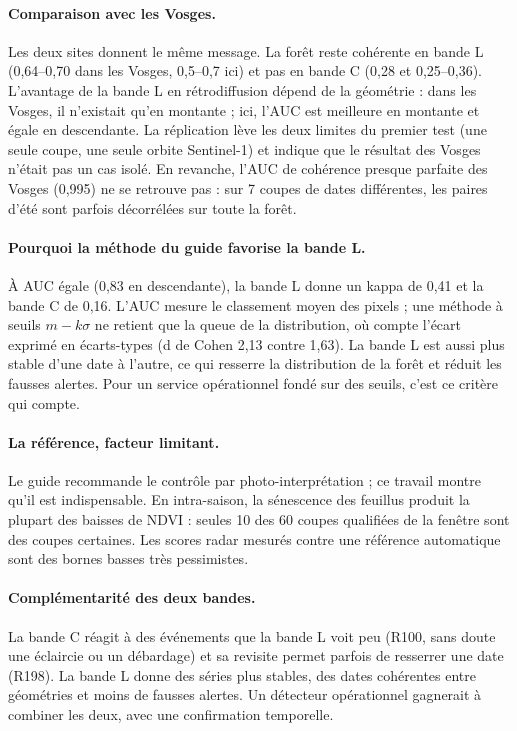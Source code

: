 \paragraph{Comparaison avec les Vosges.} Les deux sites donnent le même message. La forêt reste cohérente
en bande L (0,64--0,70 dans les Vosges, 0,5--0,7 ici) et pas en bande C (0,28 et 0,25--0,36). L'avantage de
la bande L en rétrodiffusion dépend de la géométrie : dans les Vosges, il n'existait qu'en montante ; ici,
l'AUC est meilleure en montante et égale en descendante. La réplication lève les deux limites du premier
test (une seule coupe, une seule orbite Sentinel-1) et indique que le résultat des Vosges n'était pas
un cas isolé. En revanche, l'AUC de cohérence presque parfaite des Vosges (0,995) ne se retrouve pas : sur
7 coupes de dates différentes, les paires d'été sont parfois décorrélées sur toute la forêt.

\paragraph{Pourquoi la méthode du guide favorise la bande L.} À AUC égale (0,83 en descendante), la bande L
donne un kappa de 0,41 et la bande C de 0,16. L'AUC mesure le classement moyen des pixels ; une méthode à
seuils $m-k\sigma$ ne retient que la queue de la distribution, où compte l'écart exprimé en écarts-types
(d de Cohen 2,13 contre 1,63). La bande L est aussi plus stable d'une date à l'autre, ce qui resserre la
distribution de la forêt et réduit les fausses alertes. Pour un service opérationnel fondé sur des seuils,
c'est ce critère qui compte.

\paragraph{La référence, facteur limitant.} Le guide recommande le contrôle par photo-interprétation ; ce
travail montre qu'il est indispensable. En intra-saison, la sénescence des feuillus produit la plupart des
baisses de NDVI : seules 10 des 60 coupes qualifiées de la fenêtre sont des coupes certaines. Les scores
radar mesurés contre une référence automatique sont des bornes basses très pessimistes.

\paragraph{Complémentarité des deux bandes.} La bande C réagit à des événements que la bande L voit peu
(R100, sans doute une éclaircie ou un débardage) et sa revisite permet parfois de resserrer une date
(R198). La bande L donne des séries plus stables, des dates cohérentes entre géométries et moins de fausses
alertes. Un détecteur opérationnel gagnerait à combiner les deux, avec une confirmation temporelle.

